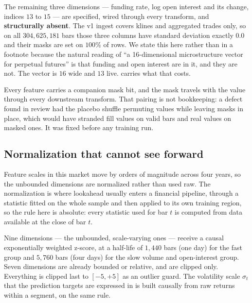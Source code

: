 The remaining three dimensions --- funding rate, log open interest and its change, indices $13$ to
$15$ --- are specified, wired through every transform, and \textbf{structurally absent}. The v1
ingest covers klines and aggregated trades only, so on all $304{,}625{,}181$ bars those three
columns have standard deviation exactly $0.0$ and their masks are set on $100\%$ of rows. We state
this here rather than in a footnote because the natural reading of ``a 16-dimensional
microstructure vector for perpetual futures'' is that funding and open interest are in it, and
they are not. The vector is $16$ wide and $13$ live.  carries what that
costs.

Every feature carries a companion mask bit, and the mask travels with the value through every
downstream transform. That pairing is not bookkeeping: a defect found in review had the placebo
shuffle permuting values while leaving masks in place, which would have stranded fill values on
valid bars and real values on masked ones. It was fixed before any training run.

\subsection{Normalization that cannot see forward}
\label{sec:data-causal}

Feature scales in this market move by orders of magnitude across four years, so the unbounded
dimensions are normalized rather than used raw. The normalization is where lookahead usually
enters a financial pipeline, through a statistic fitted on the whole sample and then applied to its
own training region, so the rule here is absolute: every statistic used for bar $t$ is computed
from data available at the close of bar $t$.

Nine dimensions --- the unbounded, scale-varying ones --- receive a causal exponentially weighted
z-score, at a half-life of $1{,}440$ bars (one day) for the fast group and $5{,}760$ bars (four
days) for the slow volume and open-interest group. Seven dimensions are already bounded or
relative, and are clipped only. Everything is clipped last to $[-5, +5]$ as an outlier guard. The
volatility scale $\sigma_t$ that the prediction targets are expressed in is built causally from
raw returns within a segment, on the same rule.

